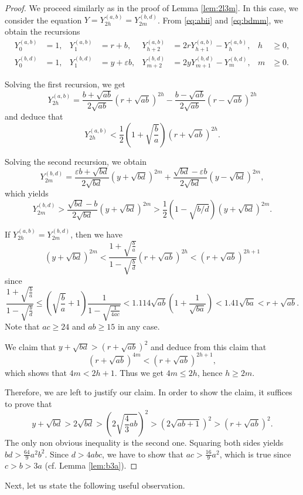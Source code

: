 \documentclass{amsart}
\theoremstyle{definition}
\begin{document}
\begin{proof}
We proceed similarly as in the proof of Lemma \ref{lem:2l3m}. In this case, we consider the equation $Y=Y^{(a,b)}_{2h}  = Y^{(b,d)}_{2m}$. From \eqref{eq:abii} and \eqref{eq:bdmm}, we obtain the recursions
\begin{align*}
Y^{(a,b)}_0&=1,& Y^{(a,b)}_1& = r + b,& Y^{(a,b)}_{h+2} &=2rY^{(a,b)}_{h+1}-Y^{(a,b)}_{h},& h&\ge 0, \\
Y^{(b,d)}_0&=1,& Y^{(b,d)}_1& =  y+ \varepsilon b,& Y^{(b,d)}_{m+2} &=2yY^{(b,d)}_{m+1}-Y^{(b,d)}_{m},& m&\ge 0.
\end{align*}

Solving the first recursion, we get
$$
Y_{2h}^{(a,b)}=\frac{b+\sqrt{ab}}{2\sqrt{ab}}(r+\sqrt{ab})^{2h}-\frac{b-\sqrt{ab}}{2\sqrt{ab}}(r-\sqrt{ab})^{2h}
$$
and deduce that
$$Y^{(a,b)}_{2h}<\frac{1}{2}\left(1+\sqrt{\frac{b}{a}}\right)(r+\sqrt{ab})^{2h}.$$

Solving the second recursion, we obtain
$$
Y_{2m}^{(b,d)}=\frac{\varepsilon b+\sqrt{bd}}{2\sqrt{bd}}(y+\sqrt{bd})^{2m}+\frac{\sqrt{bd}-\varepsilon b}{2\sqrt{bd}}(y-\sqrt{bd})^{2m},
$$
which yields 
$$
Y^{(b,d)}_{2m}>\frac{\sqrt{bd}-b}{2\sqrt{bd}}(y+\sqrt{bd})^{2m}>\frac{1}{2}(1-\sqrt{b/d})(y+\sqrt{bd})^{2m}.
$$

If $Y^{(a,b)}_{2h}  = Y^{(b,d)}_{2m}$, then we have
$$
(y+\sqrt{bd})^{2m}<\frac{1+\sqrt{\frac{b}{a}}}{1-\sqrt{\frac{b}{d}}}(r+\sqrt{ab})^{2h}<(r+\sqrt{ab})^{2h+1}
$$
since
$$
\frac{1+\sqrt{\frac{b}{a}}}{1-\sqrt{\frac{b}{d}}}\leq \left(\sqrt{\frac ba}+1\right)\frac{1}{1-\sqrt{\frac 1{4ac}}}<1.114\sqrt{ab}(1+\frac{1}{\sqrt{ba}}) <1.41 \sqrt{ba} < r+\sqrt{ab}.
$$
Note that $ac\geq 24$ and $ab \geq 15$ in any case.

We claim that $y+\sqrt{bd}>(r+\sqrt{ab})^2$ and deduce from this claim that 
$$
(r+\sqrt{ab})^{4m}<(r+\sqrt{ab})^{2h+1},
$$
which shows that $4m<2h+1$. Thus we get $4m\le 2h$, hence $h\ge 2m$.

Therefore, we are left to justify our claim. In order to show the claim, it suffices to prove that
$$y+\sqrt{bd}>2\sqrt{bd}>\left(2\sqrt{\frac 43 ab}\right)^2>\left(2\sqrt{ab+1}\right)^2>\left(r+\sqrt{ab}\right)^2.$$
The only non obvious inequality is the second one. Squaring both sides yields $bd>\frac{64}9 a^2b^2$.
Since $d>4abc$, we have to show that $ac>\frac{16}9 a^2$, which is true since $c>b>3a$ (cf. Lemma \ref{lem:b3a}).
\end{proof}

Next, let us state the following useful observation.
\end{document}
